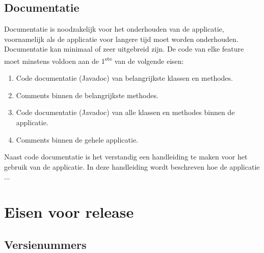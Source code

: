 \documentclass[12pt]{article}
\begin{document}
\subsection{Documentatie}
Documentatie is noodzakelijk voor het onderhouden van de applicatie, voornamelijk als de applicatie voor langere tijd moet worden onderhouden. Documentatie kan minimaal of zeer uitgebreid zijn. De code van elke feature moet minstens voldoen aan de 1\textsuperscript{ste} van de volgende eisen:

\begin{enumerate}
	\item Code documentatie (Javadoc) van belangrijkste klassen en methodes.
	\item Comments binnen de belangrijkste methodes.
	\item Code documentatie (Javadoc) van alle klassen en methodes binnen de applicatie.
	\item Comments binnen de gehele applicatie.
\end{enumerate}

\noindent Naast code documentatie is het verstandig een handleiding te maken voor het gebruik van de applicatie. In deze handleiding wordt beschreven hoe de applicatie ... %

\pagebreak
\section{Eisen voor release}

\subsection{Versienummers}
\end{document}

